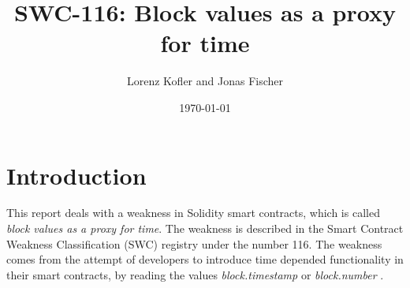\documentclass{article}
\title{SWC-116: Block values as a proxy for time}
\author{Lorenz Kofler and Jonas Fischer}
\date{\today}
\begin{document}
\maketitle
\tableofcontents
\newpage

\section{Introduction}
This report deals with a weakness in Solidity smart contracts, which is called
\textit{block values as a proxy for time}. The weakness is described in the Smart
Contract Weakness Classification (SWC) registry under the number 116. The
weakness comes from the attempt of developers to introduce time depended
functionality in their smart contracts, by reading the values \textit{block.timestamp}
or \textit{block.number} \cite{swc116}. \newline


\newpage

% 




\newpage

\end{document}
